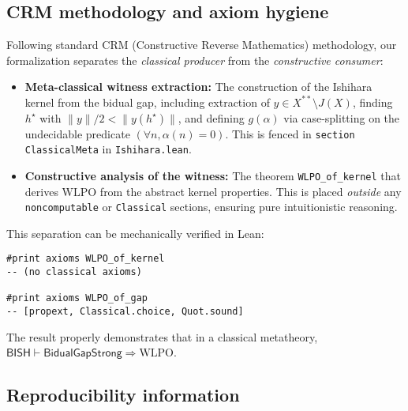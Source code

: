 \documentclass[11pt]{article}
\newcommand{\WLPO}{\mathrm{WLPO}}
\begin{document}
\subsection{CRM methodology and axiom hygiene}\label{sec:crm-hygiene}

Following standard CRM (Constructive Reverse Mathematics) methodology, our formalization 
separates the \emph{classical producer} from the \emph{constructive consumer}:

\begin{itemize}
\item \textbf{Meta-classical witness extraction:} The construction of the Ishihara kernel from the bidual gap,
  including extraction of $y \in X^{**} \setminus J(X)$, finding $h^\star$ with $\|y\|/2 < \|y(h^\star)\|$,
  and defining $g(\alpha)$ via case-splitting on the undecidable predicate $(\forall n, \alpha(n) = 0)$.
  This is fenced in \texttt{section ClassicalMeta} in \texttt{Ishihara.lean}.

\item \textbf{Constructive analysis of the witness:} The theorem \texttt{WLPO\_of\_kernel} that derives $\WLPO$ 
  from the abstract kernel properties. This is placed \emph{outside} any \texttt{noncomputable} or 
  \texttt{Classical} sections, ensuring pure intuitionistic reasoning.
\end{itemize}

This separation can be mechanically verified in Lean:
\begin{lstlisting}[language=Lean,numbers=none]
#print axioms WLPO_of_kernel
-- (no classical axioms)

#print axioms WLPO_of_gap  
-- [propext, Classical.choice, Quot.sound]
\end{lstlisting}

The result properly demonstrates that in a classical metatheory, 
$\textsf{BISH} \vdash \textsf{BidualGapStrong} \Rightarrow \WLPO$.

\subsection{Reproducibility information}
\end{document}

